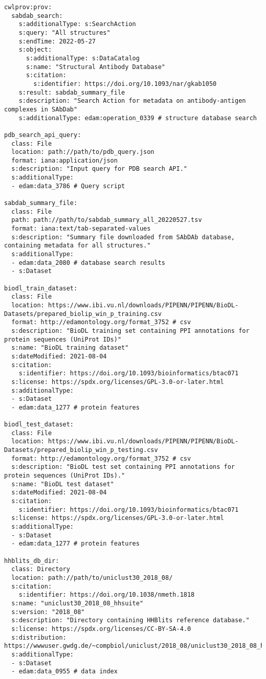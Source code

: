 \begin{verbatim}
cwlprov:prov:
  sabdab_search:
    s:additionalType: s:SearchAction
    s:query: "All structures"
    s:endTime: 2022-05-27
    s:object:
      s:additionalType: s:DataCatalog
      s:name: "Structural Antibody Database"
      s:citation:
        s:identifier: https://doi.org/10.1093/nar/gkab1050
    s:result: sabdab_summary_file
    s:description: "Search Action for metadata on antibody-antigen complexes in SAbDab"
    s:additionalType: edam:operation_0339 # structure database search

pdb_search_api_query:
  class: File
  location: path://path/to/pdb_query.json
  format: iana:application/json
  s:description: "Input query for PDB search API."
  s:additionalType:
  - edam:data_3786 # Query script

sabdab_summary_file:
  class: File
  path: path://path/to/sabdab_summary_all_20220527.tsv
  format: iana:text/tab-separated-values
  s:description: "Summary file downloaded from SAbDAb database, containing metadata for all structures."
  s:additionalType:
  - edam:data_2080 # database search results
  - s:Dataset
      
biodl_train_dataset:
  class: File
  location: https://www.ibi.vu.nl/downloads/PIPENN/PIPENN/BioDL-Datasets/prepared_biolip_win_p_training.csv
  format: http://edamontology.org/format_3752 # csv
  s:description: "BioDL training set containing PPI annotations for protein sequences (UniProt IDs)"
  s:name: "BioDL training dataset"
  s:dateModified: 2021-08-04
  s:citation:
    s:identifier: https://doi.org/10.1093/bioinformatics/btac071
  s:license: https://spdx.org/licenses/GPL-3.0-or-later.html
  s:additionalType:
  - s:Dataset
  - edam:data_1277 # protein features

biodl_test_dataset:
  class: File
  location: https://www.ibi.vu.nl/downloads/PIPENN/PIPENN/BioDL-Datasets/prepared_biolip_win_p_testing.csv
  format: http://edamontology.org/format_3752 # csv
  s:description: "BioDL test set containing PPI annotations for protein sequences (UniProt IDs)."
  s:name: "BioDL test dataset"
  s:dateModified: 2021-08-04
  s:citation:
    s:identifier: https://doi.org/10.1093/bioinformatics/btac071
  s:license: https://spdx.org/licenses/GPL-3.0-or-later.html
  s:additionalType:
  - s:Dataset
  - edam:data_1277 # protein features

hhblits_db_dir: 
  class: Directory
  location: path://path/to/uniclust30_2018_08/
  s:citation:
    s:identifier: https://doi.org/10.1038/nmeth.1818
  s:name: "uniclust30_2018_08_hhsuite"
  s:version: "2018_08"
  s:description: "Directory containing HHBlits reference database."
  s:license: https://spdx.org/licenses/CC-BY-SA-4.0
  s:distribution: https://wwwuser.gwdg.de/~compbiol/uniclust/2018_08/uniclust30_2018_08_hhsuite.tar.gz
  s:additionalType:
  - s:Dataset
  - edam:data_0955 # data index


\end{verbatim}
